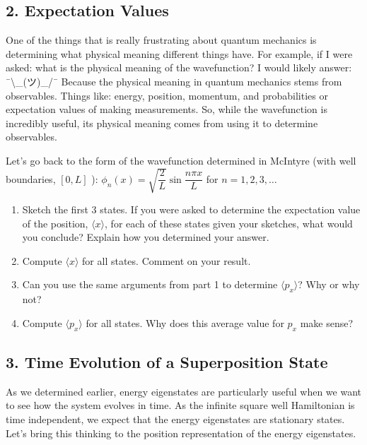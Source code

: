 \documentclass[
]{article}
\providecommand{\tightlist}{%
  \setlength{\itemsep}{0pt}\setlength{\parskip}{0pt}}
\providecommand{\tightlist}{%
  \setlength{\itemsep}{0pt}\setlength{\parskip}{0pt}}
\begin{document}
\hypertarget{expectation-values}{%
\subsection{2. Expectation Values}\label{expectation-values}}

One of the things that is really frustrating about quantum mechanics is
determining what physical meaning different things have. For example, if
I were asked: what is the physical meaning of the wavefunction? I would
likely answer: ¯\textbackslash\_(ツ)\_/¯ Because the physical meaning in
quantum mechanics stems from observables. Things like: energy, position,
momentum, and probabilities or expectation values of making
measurements. So, while the wavefunction is incredibly useful, its
physical meaning comes from using it to determine observables.

Let's go back to the form of the wavefunction determined in McIntyre
(with well boundaries, \([0,L]\) ):
\(\phi_n(x) = \sqrt{\dfrac{2}{L}} \sin \dfrac{n\pi x}{L}\) for
\(n = 1,2,3,\dots\)

\begin{enumerate}
\def\labelenumi{\arabic{enumi}.}
\tightlist
\item
  Sketch the first 3 states. If you were asked to determine the
  expectation value of the position, \(\langle x \rangle\), for each of
  these states given your sketches, what would you conclude? Explain how
  you determined your answer.
\item
  Compute \(\langle x \rangle\) for all states. Comment on your result.
\item
  Can you use the same arguments from part 1 to determine
  \(\langle p_x \rangle\)? Why or why not?
\item
  Compute \(\langle p_x \rangle\) for all states. Why does this average
  value for \(p_x\) make sense?
\end{enumerate}

\hypertarget{time-evolution-of-a-superposition-state}{%
\subsection{3. Time Evolution of a Superposition
State}\label{time-evolution-of-a-superposition-state}}

As we determined earlier, energy eigenstates are particularly useful
when we want to see how the system evolves in time. As the infinite
square well Hamiltonian is time independent, we expect that the energy
eigenstates are stationary states. Let's bring this thinking to the
position representation of the energy eigenstates.
\end{document}
